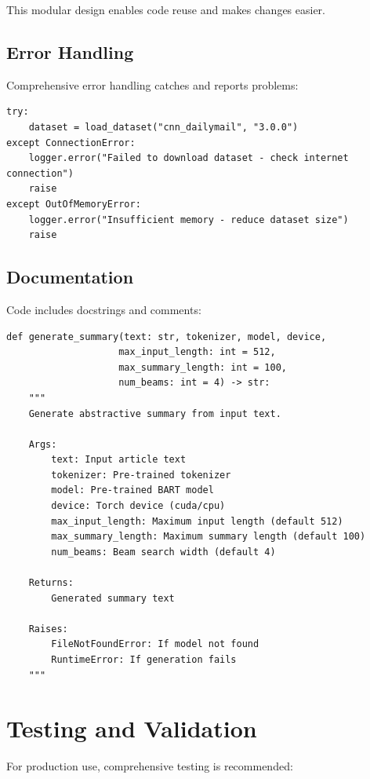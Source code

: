 \documentclass[12pt,a4paper,oneside]{report}
\begin{document}
This modular design enables code reuse and makes changes easier.

\subsection{Error Handling}
Comprehensive error handling catches and reports problems:
\begin{lstlisting}
try:
    dataset = load_dataset("cnn_dailymail", "3.0.0")
except ConnectionError:
    logger.error("Failed to download dataset - check internet connection")
    raise
except OutOfMemoryError:
    logger.error("Insufficient memory - reduce dataset size")
    raise
\end{lstlisting}

\subsection{Documentation}
Code includes docstrings and comments:
\begin{lstlisting}
def generate_summary(text: str, tokenizer, model, device,
                    max_input_length: int = 512,
                    max_summary_length: int = 100,
                    num_beams: int = 4) -> str:
    """
    Generate abstractive summary from input text.
    
    Args:
        text: Input article text
        tokenizer: Pre-trained tokenizer
        model: Pre-trained BART model
        device: Torch device (cuda/cpu)
        max_input_length: Maximum input length (default 512)
        max_summary_length: Maximum summary length (default 100)
        num_beams: Beam search width (default 4)
        
    Returns:
        Generated summary text
        
    Raises:
        FileNotFoundError: If model not found
        RuntimeError: If generation fails
    """
\end{lstlisting}

\section{Testing and Validation}
For production use, comprehensive testing is recommended:
\end{document}
